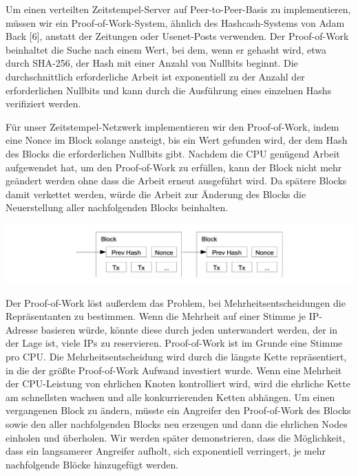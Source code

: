\documentclass[10pt]{article}
\begin{document}
	Um einen verteilten Zeitstempel-Server auf Peer-to-Peer-Basis zu implementieren, müssen wir ein Proof-of-Work-System, ähnlich des Hashcash-Systems von Adam Back [6], anstatt der Zeitungen oder Usenet-Posts verwenden. Der Proof-of-Work beinhaltet die Suche nach einem Wert, bei dem, wenn er gehasht wird, etwa durch SHA-256, der Hash mit einer Anzahl von Nullbits beginnt. Die durchschnittlich erforderliche Arbeit ist exponentiell zu der Anzahl der erforderlichen Nullbits und kann durch die Ausführung eines einzelnen Hashs verifiziert werden.

	Für unser Zeitstempel-Netzwerk implementieren wir den Proof-of-Work, indem eine Nonce im Block solange ansteigt, bis ein Wert gefunden wird, der dem Hash des Blocks die erforderlichen Nullbits gibt. Nachdem die CPU genügend Arbeit aufgewendet hat, um den Proof-of-Work zu erfüllen, kann der Block nicht mehr geändert werden ohne dass die Arbeit erneut ausgeführt wird. Da spätere Blocks damit verkettet werden, würde die Arbeit zur Änderung des Blocks die Neuerstellung aller nachfolgenden Blocks beinhalten.
	
	\begin{center}
		\includegraphics[scale=0.3]{pics/proofofwork.png}	
	\end{center}
	
	Der Proof-of-Work löst außerdem das Problem, bei Mehrheitsentscheidungen die Repräsentanten zu bestimmen. Wenn die Mehrheit auf einer Stimme je IP-Adresse basieren würde, könnte diese durch jeden unterwandert werden, der in der Lage ist, viele IPs zu reservieren. Proof-of-Work ist im Grunde eine Stimme pro CPU. Die Mehrheitsentscheidung wird durch die längste Kette repräsentiert, in die der größte Proof-of-Work Aufwand investiert wurde. Wenn eine Mehrheit der CPU-Leistung von ehrlichen Knoten kontrolliert wird, wird die ehrliche Kette am schnellsten wachsen und alle konkurrierenden Ketten abhängen. Um einen vergangenen Block zu ändern, müsste ein Angreifer den Proof-of-Work des Blocks sowie den aller nachfolgenden Blocks neu erzeugen und dann die ehrlichen Nodes einholen und überholen. Wir werden später demonstrieren, dass die Möglichkeit, dass ein langsamerer Angreifer aufholt, sich exponentiell verringert, je mehr nachfolgende Blöcke hinzugefügt werden.
\end{document}
